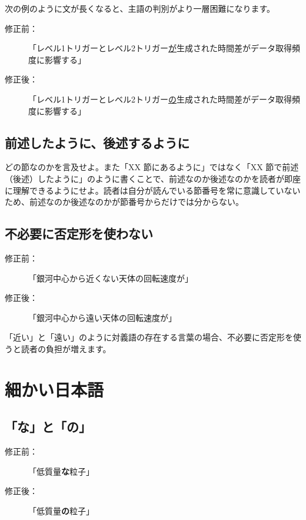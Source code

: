 次の例のように文が長くなると、主語の判別がより一層困難になります。

\begin{description}
\item[修正前：]「レベル1トリガーとレベル2トリガー\underline{が}生成された時間差がデータ取得頻度に影響する」
\item[修正後：]「レベル1トリガーとレベル2トリガー\underline{の}生成された時間差がデータ取得頻度に影響する」
\end{description}

\subsection{前述したように、後述するように}

どの節なのかを言及せよ。また「XX 節にあるように」ではなく「XX 節で前述（後述）したように」のように書くことで、前述なのか後述なのかを読者が即座に理解できるようにせよ。読者は自分が読んでいる節番号を常に意識していないため、前述なのか後述なのかが節番号からだけでは分からない。

\subsection{不必要に否定形を使わない}

\begin{description}
\item[修正前：]「銀河中心から近くない天体の回転速度が」
\item[修正後：]「銀河中心から遠い天体の回転速度が」
\end{description}

「近い」と「遠い」のように対義語の存在する言葉の場合、不必要に否定形を使うと読者の負担が増えます。

\section{細かい日本語}

\subsection{「な」と「の」}

\begin{description}
\item[修正前：]「低質量\textbf{な}粒子」
\item[修正後：]「低質量\textbf{の}粒子」
\end{description}

